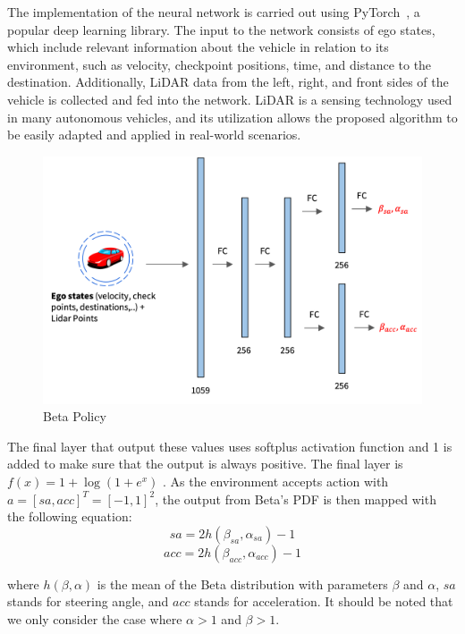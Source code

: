 The implementation of the neural network is carried out using PyTorch~\cite{paszke2019pytorch}, a popular deep learning library. The input to the network consists of ego states, which include relevant information about the vehicle in relation to its environment, such as velocity, checkpoint positions, time, and distance to the destination. Additionally, LiDAR data from the left, right, and front sides of the vehicle is collected and fed into the network. LiDAR is a sensing technology used in many autonomous vehicles, and its utilization allows the proposed algorithm to be easily adapted and applied in real-world scenarios.
\begin{figure}[h!]
    \centering
    \includegraphics[width=12cm]{assets/beta_policy}
    \caption{Beta Policy}\label{fig:beta-policy}
\end{figure}

The final layer that output these values uses softplus
activation function and 1 is added to make sure that the output
is always positive. The final layer is $f(x) = 1 + \log (1 +
e^x)$ . As the environment accepts action with $a = [sa,acc]^T=[-1,1]^2$, the output from Beta's PDF is then mapped with the following equation:
\begin{equation}
    sa = 2h(\beta_{sa}, \alpha_{sa}) - 1\label{eq:equation5}
\end{equation}
\begin{equation}
    acc = 2h(\beta_{acc}, \alpha_{acc}) - 1\label{eq:equation6}
\end{equation}

where $h(\beta, \alpha)$ is the mean of the Beta distribution with parameters $\beta$ and $\alpha$, $sa$ stands for steering angle, and $acc$ stands for acceleration.
It should be noted that we only consider the case where $\alpha > 1$ and $\beta > 1$.

